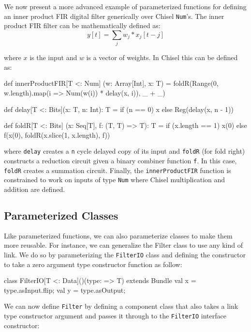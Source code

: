 \documentclass[10pt]{article}
\def\code#1{{\tt #1}}
\begin{document}
We now present a more advanced example of parameterized functions for defining an inner product FIR digital filter generically over Chisel \code{Num}'s.
The inner product FIR filter can be mathematically defined as:
\begin{equation}
y[t] = \sum_j w_j * x_j[t-j]
\end{equation}

\noindent 
where $x$ is the input and $w$ is a vector of weights.
In Chisel this can be defined as:

\begin{scala}
def innerProductFIR[T <: Num] (w: Array[Int], x: T) = 
  foldR(Range(0, w.length).map(i => Num(w(i)) * delay(x, i)), _ + _)

def delay[T <: Bits](x: T, n: Int): T =
  if (n == 0) x else Reg(delay(x, n - 1))

def foldR[T <: Bits] (x: Seq[T], f: (T, T) => T): T =
  if (x.length == 1) x(0) else f(x(0), foldR(x.slice(1, x.length), f))
\end{scala}
 
\noindent
where 
\code{delay} creates a \code{n} cycle delayed copy of its input and
\code{foldR} (for fold right) constructs a reduction circuit given a binary combiner function \code{f}.  
In this case, \code{foldR} creates a summation circuit.
Finally, the \code{innerProductFIR} function is constrained to work on inputs of type \code{Num} where Chisel multiplication and addition are defined.

\subsection{Parameterized Classes}

Like parameterized functions, we can also parameterize classes to make them more reusable.
For instance, we can generalize the Filter class to use any kind of link.  
We do so by parameterizing the \verb+FilterIO+ class and defining the constructor to take a zero argument type constructor function as follow:

\begin{scala}
class FilterIO[T <: Data]()(type: => T) extends Bundle { 
  val x = type.asInput.flip;
  val y = type.asOutput;
}
\end{scala}

\noindent
We can now define \verb+Filter+ by defining a component class that also takes a link type constructor argument and passes it through to the \verb+FilterIO+ interface constructor:
\end{document}
